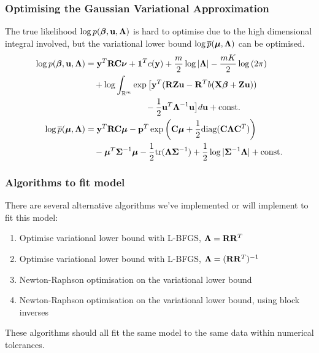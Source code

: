 \documentclass{beamer}
\begin{document}
\begin{frame}
\frametitle{Optimising the Gaussian Variational Approximation}
The true likelihood $\log p({\boldsymbol \beta}, {\bf u}, {\boldsymbol \Lambda})$ is hard to optimise due 
to the high dimensional integral involved, but the variational lower bound $\log \overline{p}({\boldsymbol \mu}, {\boldsymbol \Lambda})$ can be optimised.
\begin{align*}
\log p({\boldsymbol \beta}, {\bf u}, {\boldsymbol \Lambda}) &= {\bf y}^T {\bf R} {\bf C} {\boldsymbol \nu} + {\bf 1}^T c({\bf y}) + \frac{m}{2} \log |{\boldsymbol \Lambda}| - \frac{mK}{2} \log{(2 \pi)}\\
&\quad + \log  \int_{\mathbb{R}^{m}} \exp \big[ {\bf y}^T ({\bf R} {\bf Z} {\bf u} - {\bf R}^T b( {\bf X} {\boldsymbol \beta} + {\bf Z} {\bf u})) \\
 &\quad \quad \quad \quad \quad \quad \quad - {\frac{1}{2}} {{\bf u}^T {\boldsymbol \Lambda}^{-1} {\bf u} } \big] d {\bf u} + \text{const.}\\
\log \overline{p}({\boldsymbol \mu}, {\boldsymbol \Lambda}) &= {\bf y}^T {\bf R} {\bf C} {\boldsymbol \mu} - {\bf p}^T \exp{\left({\bf C}{\boldsymbol\mu}+ {\frac{1}{2}}\text{diag}{({\bf C}{\boldsymbol\Lambda}{\bf C}^T)}\right)} \\
& \quad - {\boldsymbol \mu}^T {\boldsymbol \Sigma}^{-1} {\boldsymbol \mu} - {\frac{1}{2}} \text{tr}{({\boldsymbol\Lambda}{\boldsymbol\Sigma}^{-1})} + {\frac{1}{2}} \log{|{\boldsymbol\Sigma}^{-1}{\boldsymbol\Lambda}|} + \text{const.} \\
\end{align*}
\end{frame}

\begin{frame}
\frametitle{Algorithms to fit model}
There are several alternative algorithms we've implemented or will implement
to fit this model:
\begin{enumerate}
\item Optimise variational lower bound with L-BFGS, ${\boldsymbol \Lambda} = {\bf R} {\bf R}^T$
\item Optimise variational lower bound with L-BFGS, ${\boldsymbol \Lambda} = ({\bf R} {\bf R}^T)^{-1}$
\item Newton-Raphson optimisation on the variational lower bound
\item Newton-Raphson optimisation on the variational lower bound, using block inverses
\end{enumerate}

These algorithms should all fit the same model to the same data
within numerical tolerances.
\end{frame}
\end{document}
